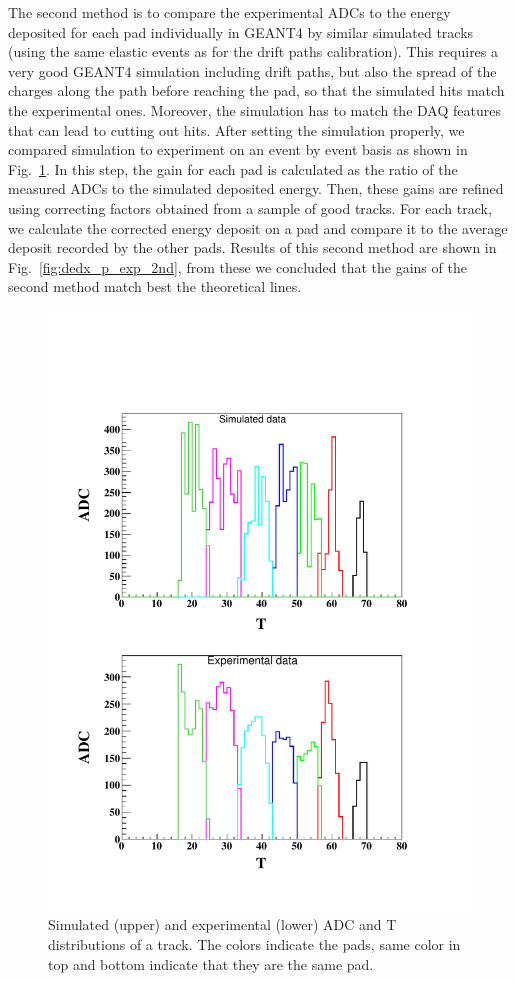 \documentclass[preprint,5p]{elsarticle}
\begin{document}
The second method is to compare the experimental ADCs to the energy deposited 
for each pad individually in GEANT4 by similar simulated tracks (using the 
same elastic events as for the drift 
paths calibration). This requires a very good GEANT4 simulation 
including drift paths, but also the spread of the charges along the path
before reaching the pad, so that the simulated hits match the experimental 
ones. Moreover, the simulation has to match the DAQ features 
that can lead to cutting out hits. After setting the simulation properly, we 
compared simulation to experiment on an event by event basis as shown in 
Fig.~\ref{fig:EVENT_adc_tdc}. In this step, the gain for each pad is calculated 
as the ratio of the measured ADCs to the simulated deposited energy.  
Then, these gains are refined using correcting factors obtained from a 
sample of good tracks. For each track, we calculate the corrected 
energy deposit on a pad and compare it to the average
deposit recorded by the other pads. 
Results of this second method are shown in Fig.~\ref{fig:dedx_p_exp_2nd},
from these we concluded that the gains of the 
second method match best the theoretical lines.

\begin{figure}[tb!]
   \centering
\includegraphics[scale=0.42]{fig_2017/Event_ADC_Graph_8799283.pdf}
\caption{Simulated (upper) and experimental (lower) ADC and T distributions 
of a track. The colors indicate the pads, same color in top and bottom indicate 
that they are the same pad.}
\label{fig:EVENT_adc_tdc}
\end{figure}
\end{document}

